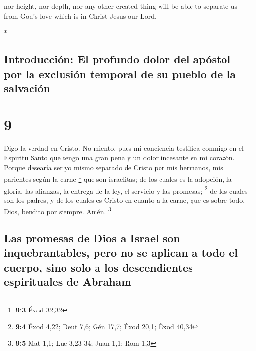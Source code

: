 \begin{paracol}{2}
\begin{otherlanguage}{english}
 nor height, nor depth, nor any other created thing will
be able to separate us from God's love which is in Christ Jesus our
Lord.

\end{otherlanguage}

\switchcolumn[0]*

\hypertarget{introducciuxf3n-el-profundo-dolor-del-apuxf3stol-por-la-exclusiuxf3n-temporal-de-su-pueblo-de-la-salvaciuxf3n}{%
\subsection{Introducción: El profundo dolor del apóstol por la exclusión
temporal de su pueblo de la
salvación}\label{introducciuxf3n-el-profundo-dolor-del-apuxf3stol-por-la-exclusiuxf3n-temporal-de-su-pueblo-de-la-salvaciuxf3n}}

\hypertarget{section-16}{%
\section{9}\label{section-16}}

 Digo la verdad en Cristo. No miento, pues mi conciencia
testifica conmigo en el Espíritu Santo  que tengo una gran
pena y un dolor incesante en mi corazón.  Porque desearía
ser yo mismo separado de Cristo por mis hermanos, mis parientes según la
carne \footnote{\textbf{9:3} Éxod 32,32}  que son
israelitas; de los cuales es la adopción, la gloria, las alianzas, la
entrega de la ley, el servicio y las promesas; \footnote{\textbf{9:4}
  Éxod 4,22; Deut 7,6; Gén 17,7; Éxod 20,1; Éxod 40,34} 
de los cuales son los padres, y de los cuales es Cristo en cuanto a la
carne, que es sobre todo, Dios, bendito por siempre. Amén. \footnote{\textbf{9:5}
  Mat 1,1; Luc 3,23-34; Juan 1,1; Rom 1,3}

\hypertarget{las-promesas-de-dios-a-israel-son-inquebrantables-pero-no-se-aplican-a-todo-el-cuerpo-sino-solo-a-los-descendientes-espirituales-de-abraham}{%
\subsection{Las promesas de Dios a Israel son inquebrantables, pero no
se aplican a todo el cuerpo, sino solo a los descendientes espirituales
de
Abraham}\label{las-promesas-de-dios-a-israel-son-inquebrantables-pero-no-se-aplican-a-todo-el-cuerpo-sino-solo-a-los-descendientes-espirituales-de-abraham}}


\end{paracol}
